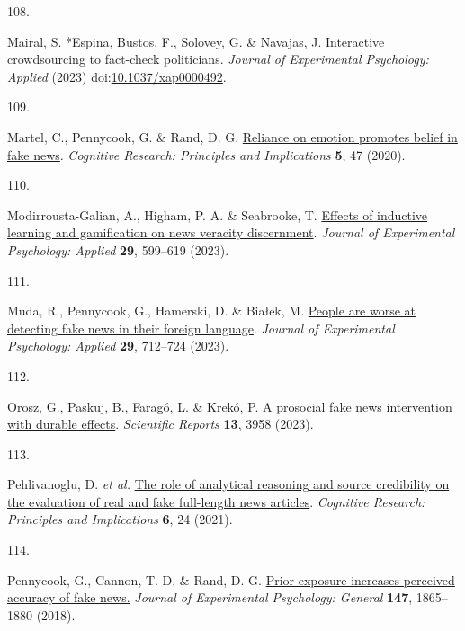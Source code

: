 \documentclass[
  man]{apa6}
\newlength{\cslhangindent}
\newlength{\csllabelwidth}
\newenvironment{CSLReferences}[2] %
 {\begin{list}{}{%
  \setlength{\itemindent}{0pt}
  \setlength{\leftmargin}{0pt}
  \setlength{\parsep}{0pt}
  \ifodd #1
   \setlength{\leftmargin}{\cslhangindent}
   \setlength{\itemindent}{-1\cslhangindent}
  \fi
  \setlength{\itemsep}{#2\baselineskip}}}
 {\end{list}}
\newcommand{\CSLLeftMargin}[1]{\parbox[t]{\csllabelwidth}{\strut#1\strut}}
\newcommand{\CSLRightInline}[1]{\parbox[t]{\linewidth - \csllabelwidth}{\strut#1\strut}}
\begin{document}
\begin{CSLReferences}{0}{0}
\CSLLeftMargin{108. }%
\CSLRightInline{Mairal, S. *Espina, Bustos, F., Solovey, G. \& Navajas, J. Interactive crowdsourcing to fact-check politicians. \emph{Journal of Experimental Psychology: Applied} (2023) doi:\href{https://doi.org/10.1037/xap0000492}{10.1037/xap0000492}.}

\CSLLeftMargin{109. }%
\CSLRightInline{*Martel, C., Pennycook, G. \& Rand, D. G. \href{https://doi.org/10.1186/s41235-020-00252-3}{Reliance on emotion promotes belief in fake news}. \emph{Cognitive Research: Principles and Implications} \textbf{5}, 47 (2020).}

\CSLLeftMargin{110. }%
\CSLRightInline{*Modirrousta-Galian, A., Higham, P. A. \& Seabrooke, T. \href{https://doi.org/10.1037/xap0000458}{Effects of inductive learning and gamification on news veracity discernment}. \emph{Journal of Experimental Psychology: Applied} \textbf{29}, 599--619 (2023).}

\CSLLeftMargin{111. }%
\CSLRightInline{*Muda, R., Pennycook, G., Hamerski, D. \& Białek, M. \href{https://doi.org/10.1037/xap0000475}{People are worse at detecting fake news in their foreign language}. \emph{Journal of Experimental Psychology: Applied} \textbf{29}, 712--724 (2023).}

\CSLLeftMargin{112. }%
\CSLRightInline{*Orosz, G., Paskuj, B., Faragó, L. \& Krekó, P. \href{https://doi.org/10.1038/s41598-023-30867-7}{A prosocial fake news intervention with durable effects}. \emph{Scientific Reports} \textbf{13}, 3958 (2023).}

\CSLLeftMargin{113. }%
\CSLRightInline{*Pehlivanoglu, D. \emph{et al.} \href{https://doi.org/10.1186/s41235-021-00292-3}{The role of analytical reasoning and source credibility on the evaluation of real and fake full-length news articles}. \emph{Cognitive Research: Principles and Implications} \textbf{6}, 24 (2021).}

\CSLLeftMargin{114. }%
\CSLRightInline{*Pennycook, G., Cannon, T. D. \& Rand, D. G. \href{https://doi.org/10.1037/xge0000465}{Prior exposure increases perceived accuracy of fake news.} \emph{Journal of Experimental Psychology: General} \textbf{147}, 1865--1880 (2018).}


\end{CSLReferences}
\end{document}
